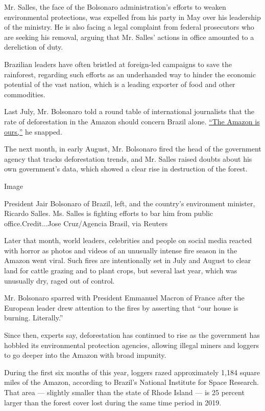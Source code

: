Mr. Salles, the face of the Bolsonaro administration's efforts to weaken
environmental protections, was expelled from his party in May over his
leadership of the ministry. He is also facing a legal complaint from
federal prosecutors who are seeking his removal, arguing that Mr.
Salles' actions in office amounted to a dereliction of duty.

Brazilian leaders have often bristled at foreign-led campaigns to save
the rainforest, regarding such efforts as an underhanded way to hinder
the economic potential of the vast nation, which is a leading exporter
of food and other commodities.

Last July, Mr. Bolsonaro told a round table of international journalists
that the rate of deforestation in the Amazon should concern Brazil
alone.
\href{https://www.theguardian.com/world/2019/jul/19/jair-bolsonaro-brazil-amazon-rainforest-deforestation}{``The
Amazon is ours,''} he snapped.

The next month, in early August, Mr. Bolsonaro fired the head of the
government agency that tracks deforestation trends, and Mr. Salles
raised doubts about his own government's data, which showed a clear rise
in destruction of the forest.

Image

President Jair Bolsonaro of Brazil, left, and the country's environment
minister, Ricardo Salles. Ms. Salles is fighting efforts to bar him from
public office.Credit...Jose Cruz/Agencia Brasil, via Reuters

Later that month, world leaders, celebrities and people on social media
reacted with horror as photos and videos of an unusually intense fire
season in the Amazon went viral. Such fires are intentionally set in
July and August to clear land for cattle grazing and to plant crops, but
several last year, which was unusually dry, raged out of control.

Mr. Bolsonaro sparred with President Emmanuel Macron of France after the
European leader drew attention to the fires by asserting that ``our
house is burning. Literally.''

Since then, experts say, deforestation has continued to rise as the
government has hobbled its environmental protection agencies, allowing
illegal miners and loggers to go deeper into the Amazon with broad
impunity.

During the first six months of this year, loggers razed approximately
1,184 square miles of the Amazon, according to Brazil's National
Institute for Space Research. That area --- slightly smaller than the
state of Rhode Island --- is 25 percent larger than the forest cover
lost during the same time period in 2019.


